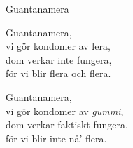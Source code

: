 \begin{song}{Guantanamera}
	
	\begin{repetition}
		Guantanamera,\\
		vi gör kondomer av lera,\\
		dom verkar inte fungera,\\
		för vi blir flera och flera.
	\end{repetition}
	
	Guantanamera,\\
	vi gör kondomer av \emph{gummi},\\
	dom verkar faktiskt fungera,\\
	för vi blir inte nå' flera.
	
\end{song}
